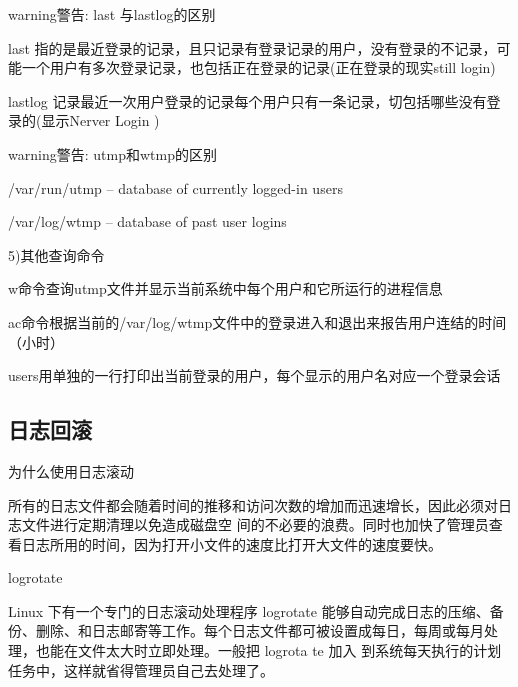 \documentclass[letterpaper,10pt]{sphinxmanual}
\begin{document}
\begin{notice}{warning}{警告:}
last 与lastlog的区别
\end{notice}

last 指的是最近登录的记录，且只记录有登录记录的用户，没有登录的不记录，可能一个用户有多次登录记录，也包括正在登录的记录(正在登录的现实still login)

lastlog 记录最近一次用户登录的记录每个用户只有一条记录，切包括哪些没有登录的(显示Nerver Login )

\begin{notice}{warning}{警告:}
utmp和wtmp的区别
\end{notice}

/var/run/utmp   --  database of currently logged-in users

/var/log/wtmp  --  database of past user logins

5)其他查询命令

w命令查询utmp文件并显示当前系统中每个用户和它所运行的进程信息

ac命令根据当前的/var/log/wtmp文件中的登录进入和退出来报告用户连结的时间（小时）

users用单独的一行打印出当前登录的用户，每个显示的用户名对应一个登录会话


\subsection{日志回滚}
\label{Linux_log/logrotate::doc}\label{Linux_log/logrotate:id1}
为什么使用日志滚动

所有的日志文件都会随着时间的推移和访问次数的增加而迅速增长，因此必须对日志文件进行定期清理以免造成磁盘空
间的不必要的浪费。同时也加快了管理员查看日志所用的时间，因为打开小文件的速度比打开大文件的速度要快。

logrotate

Linux 下有一个专门的日志滚动处理程序 logrotate 能够自动完成日志的压缩、备份、删除、和日志邮寄等工作。每个日志文件都可被设置成每日，每周或每月处理，也能在文件太大时立即处理。一般把 logrota te 加入
到系统每天执行的计划任务中，这样就省得管理员自己去处理了。
\end{document}
